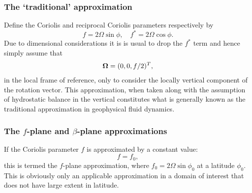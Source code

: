 \subsubsection{The `traditional' approximation}
Define the Coriolis and reciprocal Coriolis parameters \citep{cushman1994} respectively by
\begin{equation}\label{eq:coriolis_parameters}
f=2\Omega\sin\phi,\quad f^*=2\Omega\cos\phi.
\end{equation}
Due to dimensional considerations it is is usual to
drop the $f^*$ term and hence simply assume that
\begin{equation}\label{eq:f_omega}
{\mbox{\boldmath$\Omega$}}=(0,0,f/2)^T,
\end{equation}
in the local frame of reference, \ie only to consider the locally vertical
component of the rotation vector.
This approximation, when taken along with the assumption of hydrostatic balance in the
vertical constitutes what is generally known as the traditional approximation in geophysical fluid
dynamics.


\subsubsection{The $f$-plane and $\beta$-plane approximations}
If the Coriolis parameter $f$ is approximated by a constant value:
\begin{equation}\label{eq:f-plane}
f=f_0,
\end{equation}
this is termed the $f$-plane approximation,
where $f_0 = 2\Omega\sin\phi_0$ at a latitude $\phi_0$.
This is obviously only an applicable approximation in a domain of interest
that does not have large extent in latitude.

